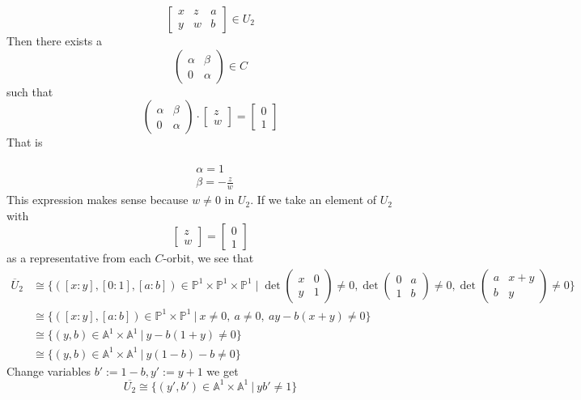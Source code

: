 \begin{example}
\[
	\begin{bmatrix}
	x&z&a\\
	y&w&b
	\end{bmatrix}
	\in U_2
\]
Then there exists a 
\[
	\begin{pmatrix}
		\alpha & \beta\\
		0 & \alpha 
	\end{pmatrix}
	\in
	C
\]
such that
\[
	\begin{pmatrix}
		\alpha & \beta\\
		0 & \alpha 	
	\end{pmatrix}
	\cdot
	\begin{bmatrix}
		z\\
		w
	\end{bmatrix}
	=
	\begin{bmatrix}
		0\\
		1
	\end{bmatrix}	
\] 
That is 

	\begin{align*}
		&\alpha=1\\
		&\beta=-\frac{z}{w}
	\end{align*}
This expression makes sense because $w\neq 0$ in $U_2$.
If we take an element of $U_2$ with 
\[
	\begin{bmatrix}
		z\\
		w
	\end{bmatrix}
	=
	\begin{bmatrix}
		0\\
		1
	\end{bmatrix}	
\]
as a representative from each $C$-orbit, we see that 
\begin{align*}
	\overline{U}_2
	&\cong
	\{
	([x:y],[0:1],[a:b])\in \mathbb{P}^1 \times \mathbb{P}^1\times \mathbb{P}^1\mid
	\operatorname{det}
	\begin{pmatrix}
	x&0\\
	y&1
	\end{pmatrix}
	\neq 0,
	\operatorname{det}
	\begin{pmatrix}
	0&a\\
	1&b
	\end{pmatrix}
	\neq 0,
	\operatorname{det}
	\begin{pmatrix}
	a&x+y\\
	b&y
	\end{pmatrix}
	\neq 0	 	
	\}	
	\\
	&\cong
	\{
	([x:y],[a:b])\in \mathbb{P}^1\times \mathbb{P}^1~|~
	x\neq 0,~
	a\neq 0,~
	ay-b(x+y)\neq 0	 	
	\}\\
	&\cong
	\{
	(y,b)\in \mathbb{A}^1\times \mathbb{A}^1~|~
	y-b(1+y)\neq 0	 	
	\}\\
	&\cong
	\{
	(y,b)\in \mathbb{A}^1\times \mathbb{A}^1~|~
	y(1-b)-b\neq 0	 	
	\}	
\end{align*}
Change variables $b':=1-b,y':=y+1$ we get
\[
	\overline{U_2}
	\cong
	\{
	(y',b')\in \mathbb{A}^1\times \mathbb{A}^1~|~
	yb'\neq 1
	\}
\]


\end{example}
